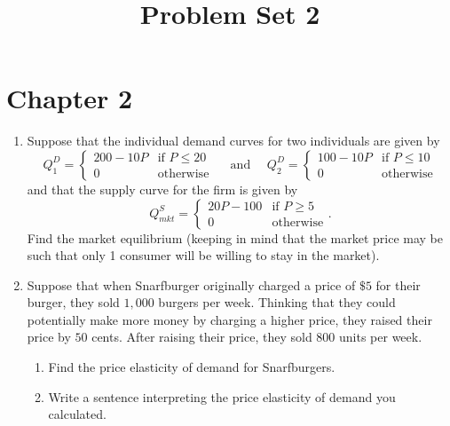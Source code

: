 \documentclass[11pt]{article}
\title{Problem Set 2}
\begin{document}
  
\section*{Chapter 2}

\begin{enumerate}
  \item Suppose that the individual demand curves for two individuals are given by
  $$
    Q^D_1 = \begin{cases} 
      200 - 10P & \text{if } P \leq 20 \\ 
      0         & \text{otherwise} 
    \end{cases}
    \quad\text{ and }\quad
    Q^D_2 = \begin{cases} 
      100 - 10P & \text{if } P \leq 10 \\ 
      0         & \text{otherwise} 
    \end{cases}
  $$
  and that the supply curve for the firm is given by
  $$
    Q^S_{mkt} = \begin{cases} 
      20P - 100 & \text{if } P \geq 5 \\ 
      0         & \text{otherwise} 
    \end{cases}.
  $$
  Find the market equilibrium (keeping in mind that the market price may be such that only 1 consumer will be willing to stay in the market).

  \newpage 
  \item Suppose that when Snarfburger originally charged a price of $\$5$ for their burger, they sold $1,000$ burgers per week. Thinking that they could potentially make more money by charging a higher price, they raised their price by $50$ cents. After raising their price, they sold $800$
  units per week. 
  
  \begin{enumerate}
    \item Find the price elasticity of demand for Snarfburgers. 
    
    \item Write a sentence interpreting the price elasticity of demand you calculated.
  \end{enumerate}
\end{enumerate}
\end{document}
